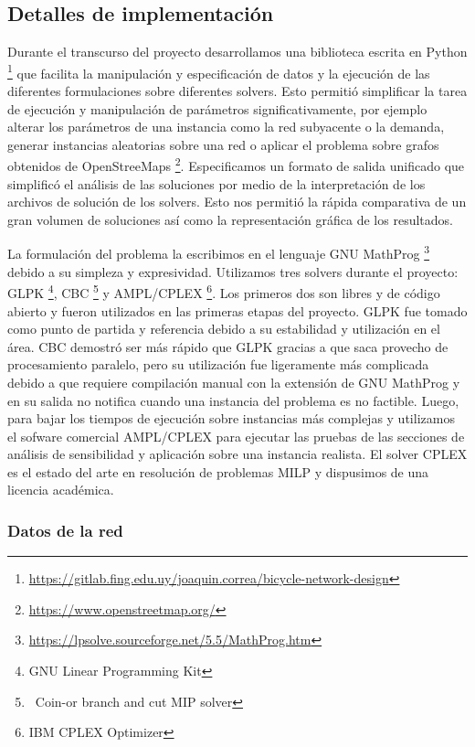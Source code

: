 \documentclass{article}
\begin{document}
  \subsection{Detalles de implementación}

  Durante el transcurso del proyecto desarrollamos una biblioteca escrita en Python \footnote{\url{https://gitlab.fing.edu.uy/joaquin.correa/bicycle-network-design}} que facilita la manipulación y especificación de datos y la ejecución de las diferentes formulaciones sobre diferentes solvers. Esto permitió simplificar la tarea de ejecución y manipulación de parámetros significativamente, por ejemplo alterar los parámetros de una instancia como la red subyacente o la demanda, generar instancias aleatorias sobre una red o aplicar el problema sobre grafos obtenidos de OpenStreeMaps \footnote{\url{https://www.openstreetmap.org/}}. Especificamos un formato de salida unificado que simplificó el análisis de las soluciones por medio de la interpretación de los archivos de solución de los solvers. Esto nos permitió la rápida comparativa de un gran volumen de soluciones así como la representación gráfica de los resultados.

  La formulación del problema la escribimos en el lenguaje GNU MathProg \footnote{\url{https://lpsolve.sourceforge.net/5.5/MathProg.htm}} debido a su simpleza y expresividad. Utilizamos tres solvers durante el proyecto: GLPK \footnote{GNU Linear Programming Kit}, CBC \footnote{\ Coin-or branch and cut MIP solver} y AMPL/CPLEX \footnote{IBM CPLEX Optimizer}. Los primeros dos son libres y de código abierto y fueron utilizados en las primeras etapas del proyecto. GLPK fue tomado como punto de partida y referencia debido a su estabilidad y utilización en el área. CBC demostró ser más rápido que GLPK gracias a que saca provecho de procesamiento paralelo, pero su utilización fue ligeramente más complicada debido a que requiere compilación manual con la extensión de GNU MathProg y en su salida no notifica cuando una instancia del problema es no factible. Luego, para bajar los tiempos de ejecución sobre instancias más complejas y utilizamos el sofware comercial AMPL/CPLEX para ejecutar las pruebas de las secciones de análisis de sensibilidad y aplicación sobre una instancia realista. El solver CPLEX es el estado del arte en resolución de problemas MILP y dispusimos de una licencia académica.

  \subsubsection{Datos de la red}
  \label{sect:costcalculation}
\end{document}
